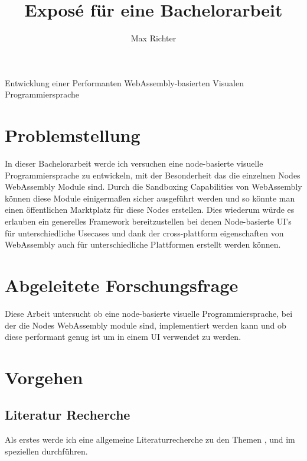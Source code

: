 \documentclass{article}
\title{Exposé für eine Bachelorarbeit}
\author{Max Richter}
\begin{document}
\pagestyle{fancy}
\fancyhead{} %
\fancyfoot{} %
\fancyfoot[LE,RO]{\thepage}

\raggedright

\maketitle
\pagebreak

{\LARGE Entwicklung einer Performanten WebAssembly-basierten Visualen Programmiersprache}
  
\section{Problemstellung}
In dieser Bachelorarbeit werde ich versuchen eine node-basierte visuelle Programmiersprache zu entwickeln, mit der Besonderheit das die einzelnen Nodes WebAssembly Module sind.
\linebreak
\linebreak
Durch die Sandboxing Capabilities von WebAssembly können diese Module einigermaßen sicher ausgeführt werden und so könnte man einen öffentlichen Marktplatz für diese Nodes erstellen.
\linebreak
\linebreak
Dies wiederum würde es erlauben ein generelles Framework bereitzustellen bei denen Node-basierte UI's für unterschiedliche Usecases und dank der cross-plattform eigenschaften von WebAssembly auch für unterschiedliche Plattformen erstellt werden können.

\section{Abgeleitete Forschungsfrage}
Diese Arbeit untersucht ob eine node-basierte visuelle Programmiersprache, bei der die Nodes WebAssembly module sind, implementiert werden kann und ob diese performant genug ist um in einem UI verwendet zu werden.

\section{Vorgehen}
\subsection{Literatur Recherche}
Als erstes werde ich eine allgemeine Literaturrecherche zu den Themen ,  und im speziellen  durchführen.
\end{document}
